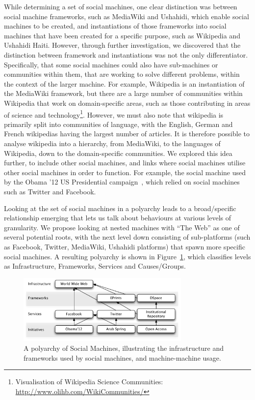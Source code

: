\documentclass{sig-alternate}
\begin{document}
While determining a set of social machines, one clear distinction was between social machine frameworks, such as MediaWiki and Ushahidi, which enable
social machines to be created, and instantiations of those frameworks into social machines that have been created for a specific purpose, such as Wikipedia
and Ushahidi Haiti. However, through further investigation, we discovered that the distinction between framework and instantiations was not the only
differentiator. Specifically, that some social machines could also have sub-machines or communities within them, that are working to solve different problems,
within the context of the larger machine. For example, Wikipedia is an instantiation of the MediaWiki framework, but there are a large number of
communities within Wikipedia that work on domain-specific areas, such as those contributing in areas of science and technology\footnote{Visualisation of Wikipedia Science Communities: \url{http://www.olihb.com/WikiCommunities/}}. However, we must also note that wikipedia is primarily split into communities of language, with the English, German and French wikipedias having the largest number of articles. It is therefore possible to analyse wikipedia into a hierarchy, from MediaWiki, to the languages of Wikipedia, down to the domain-specific communities. We explored this idea further, to include other social machines, and links where social machines utilise other social machines in order to function. For example, the social machine used by the Obama '12 US Presidential campaign~\cite{obamakieron}, which relied on social machines such as Twitter and Facebook.

Looking at the set of social machines in a polyarchy leads to a broad/specific relationship emerging that lets us talk about behaviours at various levels of granularity.  We propose looking at nested machines with ``The Web'' as one of several potential roots, with the next level down consisting of sub-platforms (such as Facebook, Twitter, MediaWiki, Ushahidi platforms) that spawn more specific social machines. A resulting polyarchy is shown in Figure~\ref{polyarchy}, which classifies levels as Infrastructure, Frameworks, Services and Causes/Groups.

\begin{figure}[htb]
\begin{center}
\includegraphics[width=8.5cm]{img/polyarchy.pdf}
\caption{A polyarchy of Social Machines, illustrating the infrastructure and frameworks used by social machines, and machine-machine usage.} \label{polyarchy}
\end{center}
\end{figure}
\end{document}
